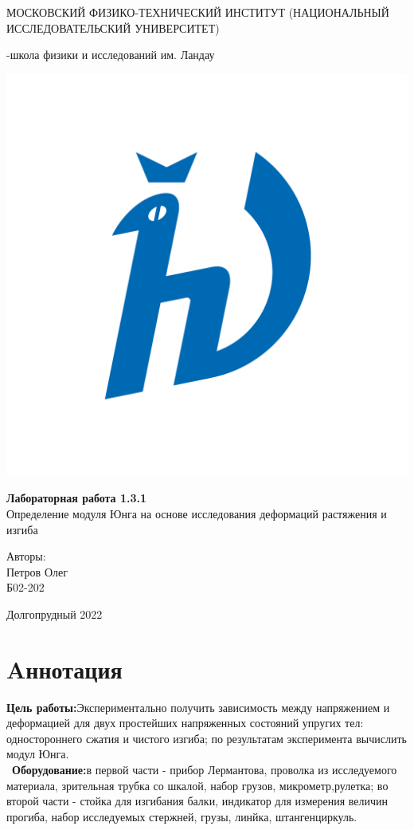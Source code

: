 \documentclass[a4paper,12pt]{article} %
\begin{document}
\begin{titlepage}
\begin{center}
    {\large МОСКОВСКИЙ ФИЗИКО-ТЕХНИЧЕСКИЙ ИНСТИТУТ (НАЦИОНАЛЬНЫЙ ИССЛЕДОВАТЕЛЬСКИЙ УНИВЕРСИТЕТ)}
\end{center}
\begin{center}
    {-школа физики и исследований им. Ландау}
\end{center}

\vspace{3.5cm}

\begin{center}
    \includegraphics[width=0.4\linewidth]{pictures/hv_full.png}
\end{center}
\vspace{0.1cm}
{\huge
\begin{center}
    {\bf Лабораторная работа 1.3.1}\\
    {Определение модуля Юнга на основе исследования деформаций растяжения и изгиба}
\end{center}
}
\vspace{2cm}
\begin{flushright}
{\LARGE Авторы:\\ Петров Олег \\
\vspace{0.2cm}
Б02-202}
\end{flushright}
\vspace{3.5cm}
\begin{center}
    Долгопрудный 2022
\end{center}
\end{titlepage}

\section{Aннотация}
\textbf{Цель работы:}Экспериментально получить зависимость между напряжением и деформацией
 для двух простейших напряженных состояний упругих тел: одностороннего сжатия и чистого изгиба;
 по результатам эксперимента вычислить модул Юнга.\\
\ \textbf{Оборудование:}в первой части - прибор Лермантова, проволка из исследуемого материала, зрительная трубка со шкалой,
набор грузов, микрометр,рулетка;  во второй части - стойка для изгибания балки, индикатор для измерения величин прогиба,
набор исследуемых стержней, грузы, линйка, штангенциркуль.
\end{document}
